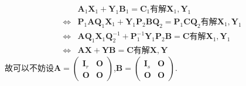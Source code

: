\documentclass[../../main.tex]{subfiles}
\begin{document}
\begin{note}
\begin{align*}
&\boldsymbol{A}_1\boldsymbol{X}_1+\boldsymbol{Y}_1\boldsymbol{B}_1=\boldsymbol{C}_1\text{有解}\boldsymbol{X}_1,\boldsymbol{Y}_1\\
\Leftrightarrow&\boldsymbol{P}_1\boldsymbol{AQ}_1\boldsymbol{X}_1+\boldsymbol{Y}_1\boldsymbol{P}_2\boldsymbol{BQ}_2=\boldsymbol{P}_1\boldsymbol{CQ}_2\text{有解}\boldsymbol{X}_1,\boldsymbol{Y}_1\\
\Leftrightarrow&\boldsymbol{AQ}_1\boldsymbol{X}_1\boldsymbol{Q}_{2}^{-1}+\boldsymbol{P}_{1}^{-1}\boldsymbol{Y}_1\boldsymbol{P}_2\boldsymbol{B}=\boldsymbol{C}\text{有解}\boldsymbol{X}_1,\boldsymbol{Y}_1\\
\Leftrightarrow&\boldsymbol{AX}+\boldsymbol{YB}=\boldsymbol{C}\text{有解}\boldsymbol{X},\boldsymbol{Y}
\end{align*}
故可以不妨设\(\boldsymbol{A}=\begin{pmatrix}
\boldsymbol{I}_r & \boldsymbol{O} \\
\boldsymbol{O} & \boldsymbol{O}
\end{pmatrix}\),\(\boldsymbol{B}=\begin{pmatrix}
\boldsymbol{I}_s & \boldsymbol{O} \\
\boldsymbol{O} & \boldsymbol{O}
\end{pmatrix}\).
\end{note}
\end{document}
